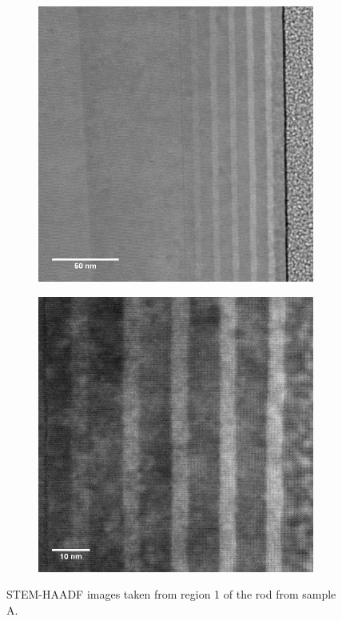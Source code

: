 \begin{figure}[!h]
	\begin{subfigure}[b]{0.45\textwidth}
		\centering
		\includegraphics[width=1\linewidth]{Figs/Ch6/A1stem}
		\caption{}
		
	\end{subfigure}%
	\hspace*{1.2cm}
	\begin{subfigure}[b]{0.45\textwidth}
		\centering
		\includegraphics[width=1\linewidth]{Figs/Ch6/A2stem}
		\caption{}
	\end{subfigure}%
	
	\caption{STEM-HAADF images taken from region 1 of the rod from sample A.}
	\label{A12}
\end{figure}
\FloatBarrier

